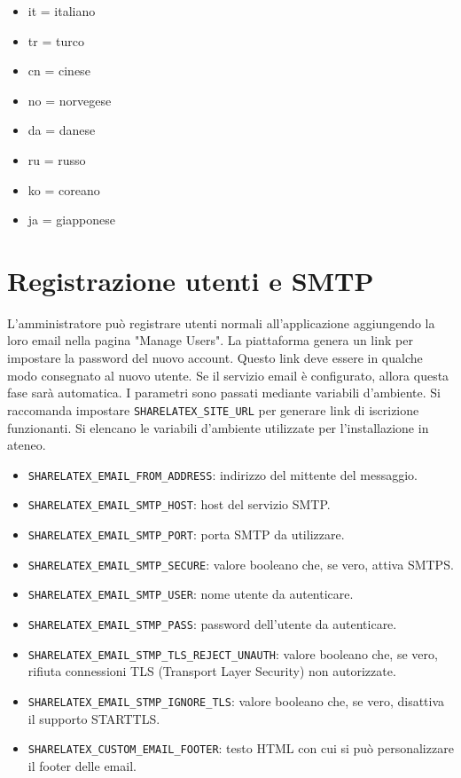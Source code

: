 \begin{itemize}
\begin{multicols}{3}
\begin{itemize}
                \item it = italiano
                \item tr = turco
                \item cn = cinese
                \item no = norvegese
                \item da = danese
                \item ru = russo
                \item ko = coreano
                \item ja = giapponese
            \end{itemize}
        \end{multicols}
\end{itemize}

\section{Registrazione utenti e SMTP}
\label{SMTP}
L'amministratore può registrare utenti normali all'applicazione aggiungendo la loro email nella pagina "Manage Users". La piattaforma genera un link per impostare la password del nuovo account. Questo link deve essere in qualche modo consegnato al nuovo utente. Se il servizio email è configurato, allora questa fase sarà automatica. I parametri sono passati mediante variabili d'ambiente. Si raccomanda impostare \verb|SHARELATEX_SITE_URL| per generare link di iscrizione funzionanti. Si elencano le variabili d'ambiente utilizzate per l'installazione in ateneo.
\begin{itemize}
    \item \verb|SHARELATEX_EMAIL_FROM_ADDRESS|: indirizzo del mittente del messaggio.
    \item \verb|SHARELATEX_EMAIL_SMTP_HOST|: host del servizio SMTP.
    \item \verb|SHARELATEX_EMAIL_SMTP_PORT|: porta SMTP da utilizzare.
    \item \verb|SHARELATEX_EMAIL_SMTP_SECURE|: valore booleano che, se vero, attiva SMTPS.
    \item \verb|SHARELATEX_EMAIL_SMTP_USER|: nome utente da autenticare.
    \item \verb|SHARELATEX_EMAIL_STMP_PASS|: password dell'utente da autenticare.
    \item \verb|SHARELATEX_EMAIL_STMP_TLS_REJECT_UNAUTH|: valore booleano che, se vero, rifiuta connessioni TLS (Transport Layer Security) non autorizzate.
    \item \verb|SHARELATEX_EMAIL_STMP_IGNORE_TLS|: valore booleano che, se vero, disattiva il supporto STARTTLS.
    \item \verb|SHARELATEX_CUSTOM_EMAIL_FOOTER|: testo HTML con cui si può personalizzare il footer delle email.
\end{itemize}
